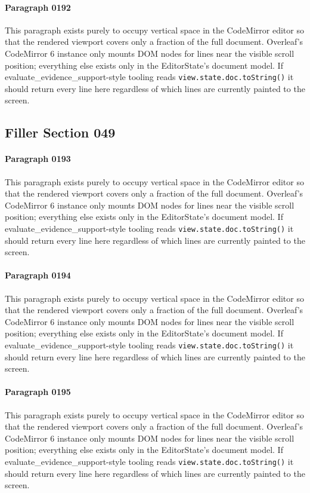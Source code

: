 \documentclass{article}
\begin{document}
\paragraph{Paragraph 0192}
This paragraph exists purely to occupy vertical space in the CodeMirror editor so that the rendered viewport covers only a fraction of the full document. Overleaf's CodeMirror 6 instance only mounts DOM nodes for lines near the visible scroll position; everything else exists only in the EditorState's document model. If evaluate\_evidence\_support-style tooling reads \texttt{view.state.doc.toString()} it should return every line here regardless of which lines are currently painted to the screen.

\subsection{Filler Section 049}
\paragraph{Paragraph 0193}
This paragraph exists purely to occupy vertical space in the CodeMirror editor so that the rendered viewport covers only a fraction of the full document. Overleaf's CodeMirror 6 instance only mounts DOM nodes for lines near the visible scroll position; everything else exists only in the EditorState's document model. If evaluate\_evidence\_support-style tooling reads \texttt{view.state.doc.toString()} it should return every line here regardless of which lines are currently painted to the screen.

\paragraph{Paragraph 0194}
This paragraph exists purely to occupy vertical space in the CodeMirror editor so that the rendered viewport covers only a fraction of the full document. Overleaf's CodeMirror 6 instance only mounts DOM nodes for lines near the visible scroll position; everything else exists only in the EditorState's document model. If evaluate\_evidence\_support-style tooling reads \texttt{view.state.doc.toString()} it should return every line here regardless of which lines are currently painted to the screen.

\paragraph{Paragraph 0195}
This paragraph exists purely to occupy vertical space in the CodeMirror editor so that the rendered viewport covers only a fraction of the full document. Overleaf's CodeMirror 6 instance only mounts DOM nodes for lines near the visible scroll position; everything else exists only in the EditorState's document model. If evaluate\_evidence\_support-style tooling reads \texttt{view.state.doc.toString()} it should return every line here regardless of which lines are currently painted to the screen.
\end{document}
